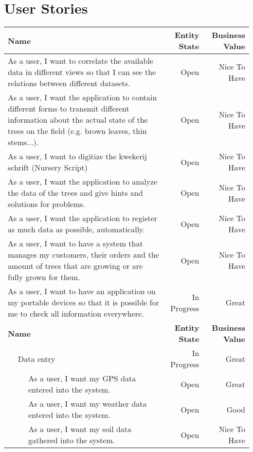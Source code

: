 \section{User Stories}
	\renewcommand{\arraystretch}{2.6}
	\begin{longtable}{ l l l r r }
		\multicolumn{3}{p{8.5cm}}{\textbf{Name}} & \textbf{Entity State} & \textbf{Business Value} \\
		\hline
		\multicolumn{3}{p{8.5cm}}{As a user, I want to correlate the available data in different views so that I can see the relations between different datasets.} & Open & Nice To Have \\
		\multicolumn{3}{p{8.5cm}}{As a user, I want the application to contain different forms to transmit different information about the actual state of the trees on the field (e.g. brown leaves, thin stems...).	} & Open & Nice To Have \\
		\multicolumn{3}{p{8.5cm}}{As a user, I want to digitize the kwekerij schrift (Nursery Script)} & Open & Nice To Have \\
		\multicolumn{3}{p{8.5cm}}{As a user, I want the application to analyze the data of the trees and give hints and solutions for problems.} & Open & Nice To Have \\
		\multicolumn{3}{p{8.5cm}}{As a user, I want the application to register as much data as possible, automatically.} & Open & Nice To Have \\
		\multicolumn{3}{p{8.5cm}}{As a user, I want to have a system that manages my customers, their orders and the amount of trees that are growing or are fully grown for them.} & Open & Nice To Have \\
		\multicolumn{3}{p{8.5cm}}{As a user, I want to have an application on my portable devices so that it is possible for me to check all information everywhere.} & In Progress & Great \\
		\multicolumn{3}{p{8.5cm}}{\textbf{Name}} & \textbf{Entity State} & \textbf{Business Value} \\
		\hline
		 & \multicolumn{2}{l}{Data entry} & In Progress & Great \\
		 &  & \parbox{7.5cm}{As a user, I want my GPS data entered into the system.} & Open & Great \\
		 &  & \parbox{7.5cm}{As a user, I want my weather data entered into the system.} & Open & Good \\
		 &  & \parbox{7.5cm}{As a user, I want my soil data gathered into the system.} & Open & Nice To Have \\

\end{longtable}
